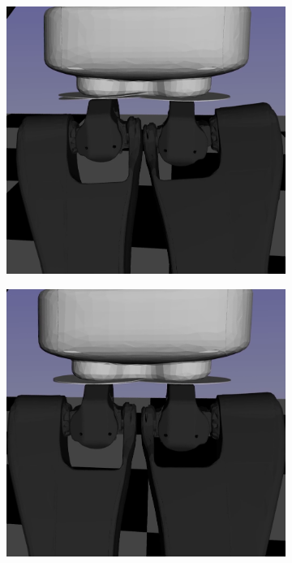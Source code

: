 \begin{figure}[t]
        \begin{subfigure}[b]{0.32\textwidth}
        \centering
        \includegraphics[width=\columnwidth]{chapter_flexible_joints/figures/zoom_flex_1.png}
    \end{subfigure}
    \hfill
    \begin{subfigure}[b]{0.32\textwidth}
        \centering
        \includegraphics[width=\columnwidth]{chapter_flexible_joints/figures/zoom_flex_2.png}

\end{subfigure}
\end{figure}
